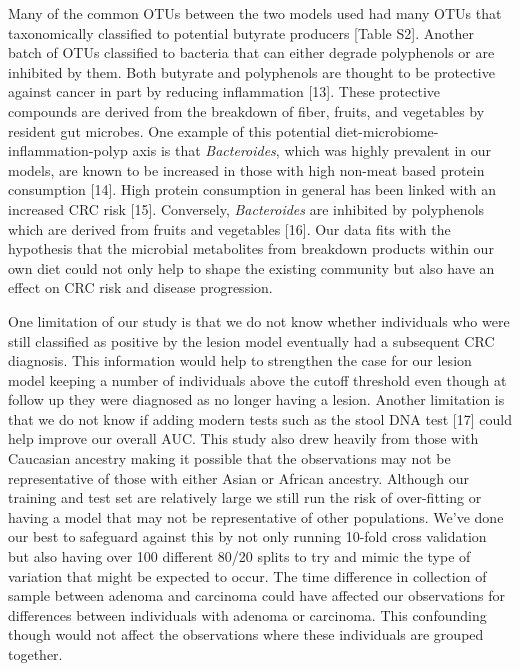 \documentclass[12pt,]{article}
\begin{document}
Many of the common OTUs between the two models used had many OTUs that
taxonomically classified to potential butyrate producers {[}Table S2{]}.
Another batch of OTUs classified to bacteria that can either degrade
polyphenols or are inhibited by them. Both butyrate and polyphenols are
thought to be protective against cancer in part by reducing inflammation
{[}13{]}. These protective compounds are derived from the breakdown of
fiber, fruits, and vegetables by resident gut microbes. One example of
this potential diet-microbiome-inflammation-polyp axis is that
\emph{Bacteroides}, which was highly prevalent in our models, are known
to be increased in those with high non-meat based protein consumption
{[}14{]}. High protein consumption in general has been linked with an
increased CRC risk {[}15{]}. Conversely, \emph{Bacteroides} are
inhibited by polyphenols which are derived from fruits and vegetables
{[}16{]}. Our data fits with the hypothesis that the microbial
metabolites from breakdown products within our own diet could not only
help to shape the existing community but also have an effect on CRC risk
and disease progression.

One limitation of our study is that we do not know whether individuals
who were still classified as positive by the lesion model eventually had
a subsequent CRC diagnosis. This information would help to strengthen
the case for our lesion model keeping a number of individuals above the
cutoff threshold even though at follow up they were diagnosed as no
longer having a lesion. Another limitation is that we do not know if
adding modern tests such as the stool DNA test {[}17{]} could help
improve our overall AUC. This study also drew heavily from those with
Caucasian ancestry making it possible that the observations may not be
representative of those with either Asian or African ancestry. Although
our training and test set are relatively large we still run the risk of
over-fitting or having a model that may not be representative of other
populations. We've done our best to safeguard against this by not only
running 10-fold cross validation but also having over 100 different
80/20 splits to try and mimic the type of variation that might be
expected to occur. The time difference in collection of sample between
adenoma and carcinoma could have affected our observations for
differences between individuals with adenoma or carcinoma. This
confounding though would not affect the observations where these
individuals are grouped together.
\end{document}
